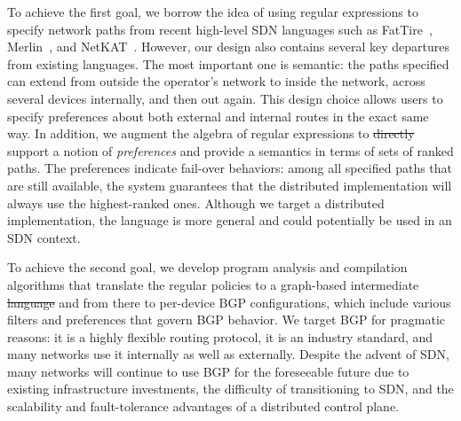 \documentclass[10pt]{sigalternate052015} %
\providecommand{\DIFadd}[1]{{\protect\color{blue}\uwave{#1}}} %
\providecommand{\DIFdel}[1]{{\protect\color{red}\sout{#1}}}                      %
\providecommand{\DIFaddbegin}{} %
\providecommand{\DIFaddend}{} %
\providecommand{\DIFdelbegin}{} %
\providecommand{\DIFdelend}{} %
\begin{document}
To achieve the first goal, we borrow the idea of using regular
expressions to specify network paths from
recent high-level SDN languages such as FatTire~\cite{fattire},
Merlin~\cite{foster:merlin}, and
NetKAT~\cite{netkat}.  However, our design also contains several key
departures from existing languages.  The most important one is semantic:  the paths specified
can extend from outside the operator's network to inside
the network, across several devices internally, and then out again. This design
choice allows users to specify preferences about both external and internal
routes in the exact same way.
In addition, we augment the algebra
of regular expressions to \DIFdelbegin \DIFdel{directly }\DIFdelend support a notion of {\em preferences} and provide a semantics in terms of sets of ranked paths. The preferences indicate fail-over behaviors:  among all specified paths that are still available,
the system guarantees that the distributed implementation will always use the highest-ranked ones.
Although we target a distributed implementation, the language is more general and could potentially be used in an SDN context.


To achieve the second goal, we develop program analysis and compilation
algorithms that translate the regular policies to a graph-based
intermediate \DIFdelbegin \DIFdel{language }\DIFdelend \DIFaddbegin \DIFadd{representation }\DIFaddend and from there to per-device BGP configurations, which include various filters and preferences that govern BGP behavior.
We target BGP for pragmatic reasons:
it is a highly flexible routing protocol,
it is an industry standard,
and many networks use it internally as well as externally.
Despite the advent of SDN, many networks will continue to
use BGP for the foreseeable future due to existing infrastructure investments, the difficulty of transitioning to SDN, and the scalability and fault-tolerance advantages of a distributed
control plane.
\end{document}
